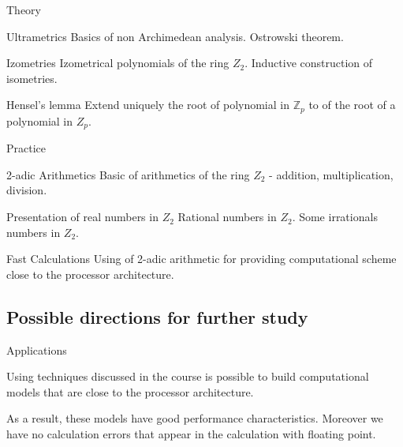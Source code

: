 \begin{frame}{Theory}
\pause
\begin{block}{Ultrametrics}
\pause
Basics of non Archimedean analysis. Ostrowski theorem.

\end{block}
\pause

\begin{block}{Izometries}
\pause
Izometrical polynomials of the ring $Z_2$. Inductive construction of isometries.
\end{block}
\pause
\begin{block}{Hensel's lemma}
\pause
Extend uniquely the root of polynomial in $\mathbb{Z}_p$ to of the root of a polynomial in $Z_p$.
\end{block}


\end{frame}



\begin{frame}{Practice}
\pause
\begin{block}{2-adic Arithmetics}
\pause
Basic of arithmetics of the ring $Z_2$ - addition, multiplication, division. 

\end{block}
\pause
\begin{block}{Presentation of real numbers in $Z_2$}
\pause
Rational numbers in $Z_2$. Some irrationals numbers in $Z_2$.
\end{block}
\pause
\begin{block}{Fast Calculations}
\pause
Using of 2-adic arithmetic for providing computational scheme close to the processor architecture.

\end{block}


\end{frame}
\subsection{Possible directions for further study}

\begin{frame}{Applications}

Using techniques discussed in the course is possible to build computational models that are close to the processor architecture.
\pause

 As a result, these models have good performance characteristics. Moreover we have no calculation errors that appear in the calculation with floating point.

\end{frame}



